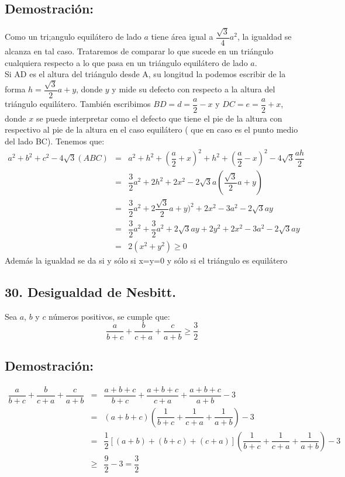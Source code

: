 \documentclass[12pt,a4paper]{article}
\begin{document}
\subsection*{Demostración:}
Como un tri;angulo equilátero de lado $a$ tiene área igual a $\dfrac{\sqrt{3}}{4}a^2$, la igualdad se alcanza en tal caso. Trataremos de comparar lo que sucede en un triángulo cualquiera respecto a lo que  pasa en  un triángulo equilátero de lado $a$. 
\\Si AD es el altura del triángulo desde A, su longitud la podemos escribir de la forma $h=\dfrac{\sqrt{3}}{2}a+y$, donde $y$ y mide su defecto con respecto a la altura del triángulo equilátero. También escribimos $BD=d=\dfrac{a}{2}-x$ y $DC=e=\dfrac{a}{2}+x$, donde $x$ se puede interpretar  como el defecto que tiene el pie de la altura con respectivo al pie de la altura en el caso equilátero ( que en caso es el punto medio del lado BC). Tenemos que:
\begin{eqnarray*}
a^2+ b^2+ c^2 -4\sqrt{3}(ABC) &=& a^2 + h^2 +(\dfrac{a}{2}+x)^2 + h^2+(\dfrac{a}{2}-x)^2- 4\sqrt{3}\dfrac{ah}{2}
\\&=& \dfrac{3}{2}a^2 +2h^2 + 2x^2 -2\sqrt{3}a(\dfrac{\sqrt{3}}{2}a+y)
\\&=&\dfrac{3}{2}a^2 + 2\dfrac{\sqrt{3}}{2}a+y)^2 +2x^2-3a^2-2\sqrt{3}ay
\\&=& \dfrac{3}{2}a^2 + \dfrac{3}{2}a^2 +2\sqrt{3}ay +2y^2+ 2x^2-3a^2- 2\sqrt{3}ay
\\&=&2(x^2+y^2)\geq 0
\end{eqnarray*}
Además la igualdad se da si y sólo si x=y=0 y sólo si el triángulo es equilátero
\subsection*{30. Desigualdad de Nesbitt.}
Sea $a$, $b$ y $c$ números positivos, se cumple que:
$$\dfrac{a}{b+c} + \dfrac{b}{c+a}+ \dfrac{c}{a+b} \geq \dfrac{3}{2}$$
\subsection*{Demostración:}
\begin{eqnarray*}
\dfrac{a}{b+c}+ \dfrac{b}{c+a}+\dfrac{c}{a+b}&=&
\dfrac{a+b+c}{b+c}+\dfrac{a+b+c}{c+a}+\dfrac{a+b+c}{a+b}-3
\\&=&(a+b+c)\left(\dfrac{1}{b+c}+\dfrac{1}{c+a}+\dfrac{1}{a+b}\right)-3
\\&=&\dfrac{1}{2}[(a+b)+(b+c)+(c+a)]\left(\dfrac{1}{b+c}+\dfrac{1}{c+a}+\dfrac{1}{a+b}\right)-3
\\&\geq&\dfrac{9}{2}-3=\dfrac{3}{2}
\end{eqnarray*}
\end{document}
